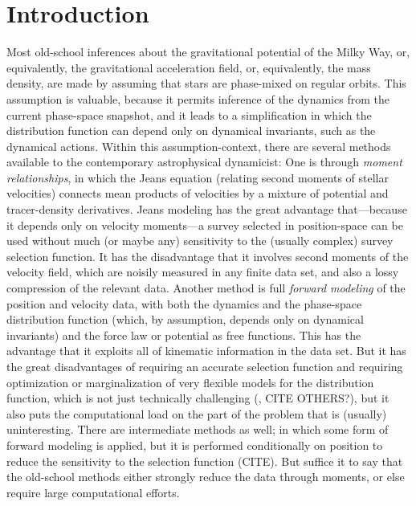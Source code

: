 \documentclass[modern]{aastex62}
\begin{document}

\section{Introduction}

Most old-school inferences about the gravitational potential of the
Milky Way, or, equivalently, the gravitational acceleration field, or,
equivalently, the mass density, are made by assuming that stars are
phase-mixed on regular orbits.
This assumption is valuable, because it permits inference of the
dynamics from the current phase-space snapshot, and it leads to a
simplification in which the distribution function can depend only on
dynamical invariants, such as the dynamical actions.
Within this assumption-context, there are several methods available to the
contemporary astrophysical dynamicist:
One is through \emph{moment relationships}, in which the Jeans equation (relating second moments
of stellar velocities) connects mean products of velocities by a mixture of potential and
tracer-density derivatives.
Jeans modeling has the great advantage that---because it depends only on velocity
moments---a survey selected in position-space can be used without much
(or maybe any) sensitivity to the (usually complex) survey selection
function.
It has the disadvantage that it involves second moments of the velocity
field, which are noisily measured in any finite data set, and also a lossy
compression of the relevant data.
Another method is full \emph{forward modeling} of the position and velocity
data, with both the dynamics and the phase-space distribution function
(which, by assumption, depends only on dynamical invariants) and the
force law or potential as free functions.
This has the advantage that it exploits all of kinematic information in
the data set.
But it has the great disadvantages of requiring an accurate selection function
and requiring optimization or marginalization of very flexible models for
the distribution function, which is not just technically challenging
(\citealt{ss}, CITE OTHERS?),
but it also puts the computational load on the part of the problem that is
(usually) uninteresting.
There are intermediate methods as well; in which some form of forward
modeling is applied, but it is performed conditionally on position to reduce
the sensitivity to the selection function (CITE).
But suffice it to say that the old-school methods either strongly reduce the
data through moments, or else require large computational efforts.
\end{document}
